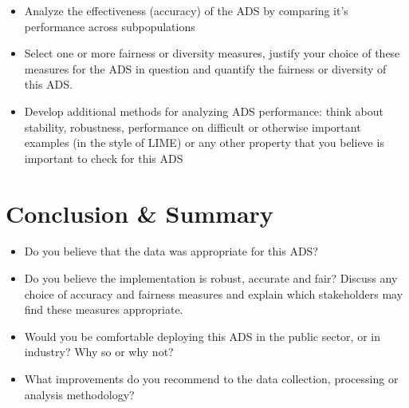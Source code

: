 \documentclass[11pt]{article}
\begin{document}
\begin{itemize}
\item Analyze the effectiveness (accuracy) of the ADS by comparing it's performance across subpopulations
\item Select one or more fairness or diversity measures, justify your choice of these measures for the ADS in question and quantify the fairness or diversity of this ADS.
\item Develop additional methods for analyzing ADS performance: think about stability, robustness, performance on difficult or otherwise important examples (in the style of LIME) or any other property that you believe is important to check for this ADS
\end{itemize}

\pagebreak

\section{Conclusion \& Summary}
\begin{itemize}
\item Do you believe that the data was appropriate for this ADS?  
\item Do you believe the implementation is robust, accurate and fair?  Discuss any choice of accuracy and fairness measures and explain which stakeholders may find these measures appropriate.
\item Would you be comfortable deploying this ADS in the public sector, or in industry?  Why so or why not?
\item What improvements do you recommend to the data collection, processing or analysis methodology?
\end{itemize}

\end{document}
